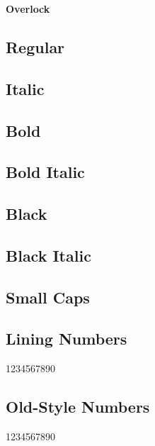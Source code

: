 \documentclass[12pt]{article}
\begin{document}
\begin{center}\Huge\bfseries
Overlock
\end{center}

\subsection*{Regular}
\lipsum[1]

\subsection*{Italic}
\textit{\lipsum[2]}

\subsection*{Bold}

\textbf{\lipsum[3]}

\subsection*{Bold Italic}

\textbf{\textit{\lipsum[4]}}


\subsection*{Black}

{\overlockBlack \lipsum[5]}

\subsection*{Black Italic}

{\overlockBlack\itshape\lipsum[6]}

\subsection*{Small Caps}
\textsc{\lipsum[7]}

\subsection*{Lining Numbers}

1234567890

\subsection*{Old-Style Numbers}

\textsc{1234567890}
\end{document}
